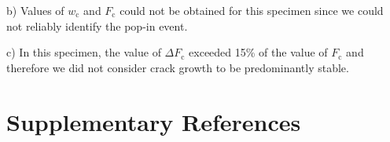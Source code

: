 \documentclass[12pt,onecolumn]{article}
\begin{document}
\begin{bibunit}
\begin{table}
{\begin{threeparttable}
\begin{tablenotes}
{\item[b)] Values of $w_\mathrm{c}$ and $F_\mathrm{c}$ could not be obtained for this specimen since we could not reliably identify the pop-in event.
\item[c)] In this specimen, the value of $\Delta F_\mathrm{c}$ exceeded 15\% of the value of $F_\mathrm{c}$ and therefore we did not consider crack growth to be predominantly stable.}
\end{tablenotes}
\end{threeparttable}
}
\end{table}

\restoregeometry

\section*{Supplementary References}
\singlespacing
\putbib[refs]
\end{bibunit} 

\end{document}
